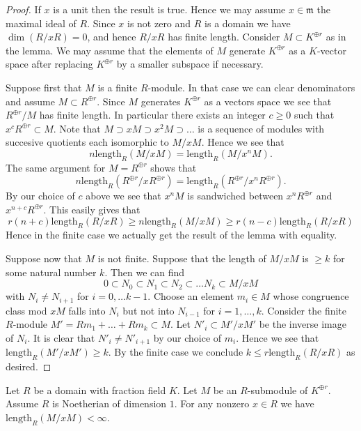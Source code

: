 \begin{proof}
If $x$ is a unit then the result is true. Hence we may assume
$x \in \mathfrak m$ the maximal ideal of $R$. Since $x$ is not
zero and $R$ is a domain we have $\dim(R/xR) = 0$, and hence
$R/xR$ has finite length. Consider $M \subset K^{\oplus r}$ as
in the lemma. We may assume that the elements of $M$ generate
$K^{\oplus r}$ as a $K$-vector space after replacing $K^{\oplus r}$
by a smaller subspace if necessary.

\medskip\noindent
Suppose first that $M$ is a finite $R$-module. In that case we can clear
denominators and assume $M \subset R^{\oplus r}$. Since
$M$ generates $K^{\oplus r}$ as a vectors space we see that
$R^{\oplus r}/M$ has finite length. In particular there exists
an integer $c \geq 0$ such that $x^cR^{\oplus r} \subset M$.
Note that $M \supset xM \supset x^2M \supset \ldots$ is a sequence of
modules with succesive quotients each isomorphic to $M/xM$. Hence
we see that
$$
n \text{length}_R(M/xM) = \text{length}_R(M/x^nM).
$$
The same argument for $M = R^{\oplus r}$ shows that
$$
n \text{length}_R(R^{\oplus r}/xR^{\oplus r}) =
\text{length}_R(R^{\oplus r}/x^nR^{\oplus r}).
$$
By our choice of $c$ above we see that $x^nM$ is sandwiched between
$x^n R^{\oplus r}$ and $x^{n + c}R^{\oplus r}$. This easily gives that
$$
r(n + c) \text{length}_R(R/xR)
\geq
n \text{length}_R(M/xM)
\geq
r (n - c) \text{length}_R(R/xR)
$$
Hence in the finite case we actually get the result of the lemma with
equality.

\medskip\noindent
Suppose now that $M$ is not finite. Suppose that the length of $M/xM$ is
$\geq k$ for some natural number $k$. Then we can find
$$
0 \subset N_0 \subset N_1 \subset N_2 \subset \ldots N_k \subset M/xM
$$
with $N_i \not = N_{i + 1}$ for $i = 0, \ldots k - 1$.
Choose an element $m_i \in M$ whose congruence class mod $xM$ falls
into $N_i$ but not into $N_{i - 1}$ for $i = 1, \ldots, k$.
Consider the finite $R$-module $M' = Rm_1 + \ldots + Rm_k \subset M$.
Let $N'_i \subset M'/xM'$ be the inverse image of $N_i$.
It is clear that $N'_i \not =N'_{i + 1}$ by our choice of $m_i$.
Hence we see that $\text{length}_R(M'/xM') \geq k$. By the
finite case we conclude $k \leq r\text{length}_R(R/xR)$
as desired.
\end{proof}

\begin{lemma}
\label{lemma-finite-length-global}
Let $R$ be a domain with fraction field $K$.
Let $M$ be an $R$-submodule of $K^{\oplus r}$.
Assume $R$ is Noetherian of dimension $1$.
For any nonzero $x \in R$ we have
$\text{length}_R(M/xM) < \infty$.
\end{lemma}

